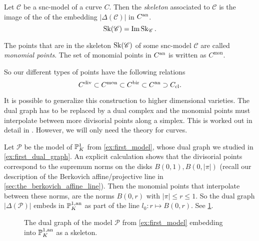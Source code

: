 \begin{definition}
	Let $\mathscr C$ be a snc-model of a curve $C$. 
	Then the \emph{skeleton} associated to $\mathscr C$ is the image of the of the embedding $|\Delta(\mathscr C)|$ in $C{}^{\text{an}}$. 
	\[
		\operatorname{Sk}(\mathscr C) = \operatorname{Im} \operatorname{Sk}_{\mathscr C}
	.\] 
\end{definition}
\begin{definition}
	The points that are in the skeleton $\operatorname{Sk}(\mathscr C)$ of some snc-model $\mathscr C$ are called \emph{monomial points}. 
	The set of monomial points in $C{}^{\text{an}}$ is written as  $C^{\text{mon}}$. 
\end{definition}

So our different types of points have the following relations \[
C^{\text{div}} \subset C^{\text{mon}} \subset C{}^{\text{bir}} \subset C{}^{\text{an}} \supset C_\text{cl}
.\] 

\begin{remark}
	It is possible to generalize this construction to higher dimensional varieties. 
	The dual graph has to be replaced by a dual complex and the monomial points must interpolate between more divisorial points along a simplex.
	This is worked out in detail in \cite{mustataWeightFunctionsNonArchimedean2015}. 
	However, we will only need the theory for curves. 
\end{remark}

\begin{example}
	Let $\mathscr P$ be the model of $\mathbb{P}^{1}_K$ from \cref{ex:first_model}, whose dual graph we studied in \cref{ex:first_dual_graph}.
	An explicit calculation shows that the divisorial points correspond to the supremum norms on the disks $B(0, 1), B(0, |\pi|)$ (recall our description of the Berkovich affine/projective line in \cref{sec:the_berkovich_affine_line}).
	Then the monomial points that interpolate between these norms, are the norms $B(0, r)$ with $|\pi| \le r \le 1$.
	So the dual graph $|\Delta(\mathscr P)|$ embeds in $\mathbb{P}_K^{1, \text{an}}$ as part of the line $l_0: r \mapsto B(0, r)$. 
	See \cref{fig:skeleton_projective_line}. 
\end{example}
\begin{figure}[ht]
    \centering
    \caption{The dual graph of the model $\mathscr P$ from \cref{ex:first_model} embedding into $\mathbb{P}_K^{1, \text{an}}$ as a skeleton.}
    \label{fig:skeleton_projective_line}
\end{figure}


